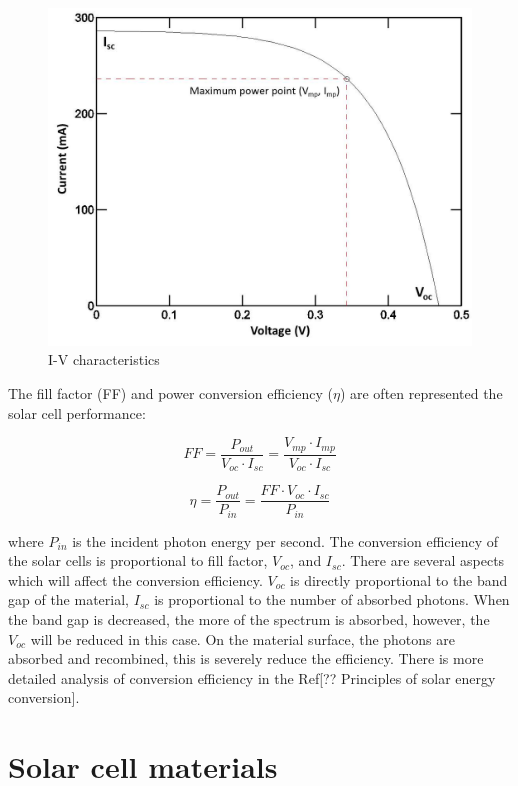 \documentclass[a4paper, 12pt, titlepage,oneside,drop]{kthesis}
\begin{document}
\begin{figure}[H]
\centering
\includegraphics[scale=0.5]{IV.jpg}
\caption{I-V characteristics}
\label{ivcharac}
\end{figure}


The fill factor (FF) and power conversion efficiency ($\eta$) are often represented the solar cell performance:

\begin{equation}
FF=\frac{P_{out}}{V_{oc} \cdot I_{sc}} = \frac{V_{mp} \cdot I_{mp}}{V_{oc} \cdot I_{sc}}
\end{equation}

\begin{equation}
\eta =\frac{P_{out}}{P_{in}} = \frac{FF \cdot V_{oc} \cdot I_{sc}}{P_{in}}
\end{equation}

where $P_{in}$ is the incident photon energy per second. The conversion efficiency of the solar cells is proportional to fill factor, $V_{oc}$, and $I_{sc}$. There are several aspects which will affect
the conversion efficiency. $V_{oc}$ is directly proportional to the band gap of the material, $I_{sc}$ is proportional to the number of absorbed photons. When the band gap is decreased, the more of the spectrum is absorbed, however, 
the $V_{oc}$ will be reduced in this case. On the material surface, the photons are absorbed and recombined, this is severely reduce the efficiency. There is more detailed analysis of conversion efficiency in the Ref[?? Principles of solar energy conversion].


\section{Solar cell materials}
\end{document}
